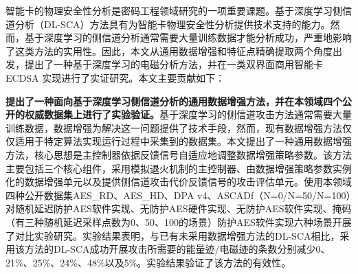 %

智能卡的物理安全性分析是密码工程领域研究的一项重要课题。基于深度学习侧信道分析（DL-SCA）方法具有为智能卡物理安全性分析提供技术支持的能力。然而，基于深度学习的侧信道分析通常需要大量训练数据才能分析成功，严重地影响了这类方法的实用性。因此，本文从通用数据增强和特征点精确提取两个角度出发，提出了一种基于深度学习的电磁分析方法，并在一类双界面商用智能卡ECDSA 实现进行了实证研究。本文主要贡献如下：

\textbf{提出了一种面向基于深度学习侧信道分析的通用数据增强方法，并在本领域四个公开的权威数据集上进行了实验验证。}基于深度学习的侧信道攻击方法通常需要大量训练数据，数据增强为解决这一问题提供了技术手段，然而，现有数据增强方法仅仅适用于特定算法实现运行过程中采集到的数据集。本文提出了一种通用数据增强方法，核心思想是主控制器依据反馈信号自适应地调整数据增强策略参数。该方法主要包括三个核心组件，采用模拟退火机制的主控制器、由数据增强策略参数实例化的数据增强单元以及提供侧信道攻击代价反馈信号的攻击评估单元。使用本领域四种公开数据集AES\_RD、AES\_HD、DPA v4、ASCADf（N=0/N=50/N=100）对随机延迟防护AES软件实现、无防护AES硬件实现、无防护AES软件实现、掩码（有三种随机延迟采样点数为0、50、100的场景）防护AES软件实现六种场景开展了对比实验研究。实验结果表明，与已有未采用数据增强方法的DL-SCA相比，采用该方法的DL-SCA成功开展攻击所需要的能量迹/电磁迹的条数分别减少0、21\%、25\%、24\%、48\%以及5\%。实验结果验证了该方法的有效性。

